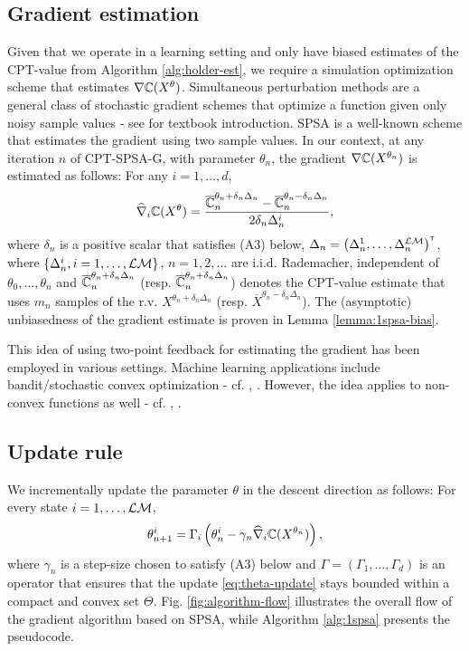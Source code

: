 \documentclass[11pt,letterpaper,english]{article}
\begin{document}
\subsection{Gradient estimation} 
Given that we operate in a learning setting and only have biased estimates of the CPT-value from Algorithm \ref{alg:holder-est}, we require a simulation optimization scheme that estimates $\nabla \mathbb{C}(X^\theta)$.  
Simultaneous perturbation methods are a general class of stochastic gradient schemes that optimize a function given only noisy sample values - see \cite{Bhatnagar13SR} for textbook introduction. SPSA is a well-known scheme that estimates the gradient using two sample values. In our context, at any iteration $n$ of CPT-SPSA-G, with parameter $\theta_n$, the gradient $\nabla \mathbb{C}(X^{\theta_n})$ is estimated as follows: For any  $i=1,\ldots,d$,
$$\widehat \nabla_{i} \mathbb{C}(X^\theta) = \dfrac{\overline {\mathbb{C}}_n^{\theta_n+\delta_n \Delta_n} - \overline {\mathbb{C}}_n^{\theta_n-\delta_n \Delta_n}}{2 \delta_n \Delta_n^{i}},$$
where $\delta_n$ is a positive scalar that satisfies (A3) below, $\Delta_n = \left( \Delta_n^{1},\ldots,\Delta_n^{\mathcal{L}\mathcal{M}}\right)^\mathsf{\scriptscriptstyle T}$, where $\{\Delta_n^{i}, i=1,\ldots,\mathcal{L}\mathcal{M}\}$, $n=1,2,\ldots$ are i.i.d. Rademacher, independent of $\theta_0,\ldots,\theta_n$ and $\overline {\mathbb{C}}_n^{\theta_n+\delta_n \Delta_n}$ (resp. $\overline {\mathbb{C}}_n^{\theta_n+\delta_n \Delta_n}$) denotes the CPT-value estimate that uses $m_n$ samples of the r.v. $X^{\theta_n+\delta_n \Delta_n}$ (resp. $\overline X^{\theta_n-\delta_n \Delta_n}$).
The (asymptotic) unbiasedness of the gradient estimate is proven in Lemma \ref{lemma:1spsa-bias}.

This idea of using two-point feedback for estimating the gradient has been employed in various settings. Machine learning applications include bandit/stochastic convex optimization - cf. 
\cite{hazan2015online}, \cite{duchi2013optimal}. However, the idea applies to non-convex functions as well - cf. \cite{spall2005introduction}, \cite{Bhatnagar13SR}.


\subsection{Update rule} We incrementally update the parameter $\theta$ in the descent direction as follows: For every state $i=1,\ldots,\mathcal{L}\mathcal{M}$,
\begin{align}
\theta^{i}_{n+1} = \Gamma_{i}\left(\theta^{i}_n - \gamma_n  \widehat \nabla_{i} \mathbb{C}(X^{\theta_n})\right),
\label{eq:theta-update}
\end{align}
where  $\gamma_n$ is a step-size chosen to satisfy (A3) below and
$\Gamma=\left(\Gamma_{1},\ldots,\Gamma_{d}\right)$ is an operator that ensures that the update \eqref{eq:theta-update} stays bounded within a compact and convex set $\Theta$. 
Fig. \ref{fig:algorithm-flow} illustrates the overall flow of the gradient algorithm based on SPSA, while Algorithm \ref{alg:1spsa}  presents the pseudocode.  
\end{document}
